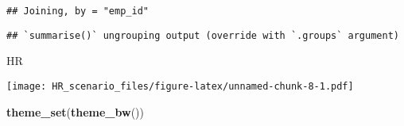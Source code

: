 \documentclass[
]{article}
\newenvironment{Shaded}{\begin{snugshade}}{\end{snugshade}}
\newcommand{\KeywordTok}[1]{\textcolor[rgb]{0.13,0.29,0.53}{\textbf{#1}}}
\newcommand{\NormalTok}[1]{#1}
\begin{document}
\begin{verbatim}
## Joining, by = "emp_id"
\end{verbatim}

\begin{verbatim}
## `summarise()` ungrouping output (override with `.groups` argument)
\end{verbatim}

\begin{Shaded}
\begin{Highlighting}[]
\NormalTok{HR}
\end{Highlighting}
\end{Shaded}

\texttt{[image: HR\_scenario\_files/figure-latex/unnamed-chunk-8-1.pdf]}

\begin{Shaded}
\begin{Highlighting}[]
\KeywordTok{theme\_set}\NormalTok{(}\KeywordTok{theme\_bw}\NormalTok{())}


\end{Highlighting}
\end{Shaded}
\end{document}
